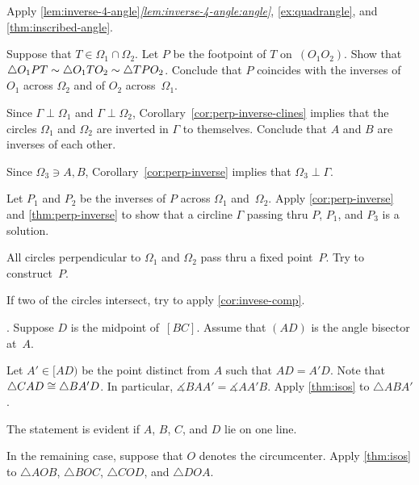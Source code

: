 Apply \ref{lem:inverse-4-angle}\textit{\ref{lem:inverse-4-angle:angle}}, 
\ref{ex:quadrangle},
and \ref{thm:inscribed-angle}.

Suppose that $T\in \Omega_1\cap\Omega_2$.
Let $P$ be the footpoint of $T$ on~$(O_1O_2)$.
Show that
$\triangle O_1PT
\sim \triangle O_1TO_2
\sim \triangle TPO_2$.
Conclude that $P$ coincides with the inverses of $O_1$ across $\Omega_2$ and of $O_2$ across~$\Omega_1$.

Since $\Gamma\perp\Omega_1$ and $\Gamma\perp\Omega_2$,
Corollary~\ref{cor:perp-inverse-clines} 
implies that
the circles $\Omega_1$ and $\Omega_2$ are inverted in $\Gamma$ 
to themselves.
Conclude that $A$ and $B$ are inverses of each other.

Since $\Omega_3\ni A,B$,
Corollary~\ref{cor:perp-inverse} implies that
$\Omega_3\perp \Gamma$.

Let $P_1$ and $P_2$ be the inverses of $P$ 
across $\Omega_1$ and~$\Omega_2$.
Apply \ref{cor:perp-inverse} and \ref{thm:perp-inverse}
to show that a circline $\Gamma$ passing thru $P$, $P_1$, and $P_3$ is a solution.

All circles perpendicular to $\Omega_1$ and $\Omega_2$ pass thru a fixed point~$P$.
Try to construct~$P$.

If two of the circles intersect, try to apply \ref{cor:invese-comp}.

\setcounter{eqtn}{0}

\parbf{\ref{ex:abs-bisect=median}}.
Suppose $D$ is the midpoint of~$[BC]$.
Assume that $(AD)$ is the angle bisector at~$A$.

Let $A'\in [AD)$ be the point distinct from $A$ such that $AD=A'D$.
Note that $\triangle CAD\cong\triangle BA'D$.
In particular, $\measuredangle BAA'=\measuredangle AA'B$.
Apply \ref{thm:isos} to  $\triangle ABA'$.

The statement is evident if $A$, $B$, $C$, and $D$ lie on one line.

In the remaining case, suppose that $O$ denotes the circumcenter.
Apply \ref{thm:isos} to
$\triangle AOB$,
$\triangle BOC$, 
$\triangle COD$, 
and
$\triangle DOA$. 

